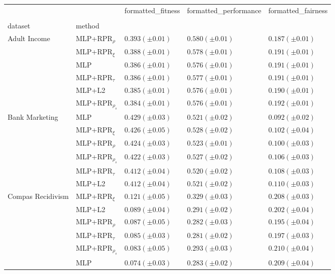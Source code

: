 \begin{tabular}{lllll}
\toprule
 &  & formatted_fitness & formatted_performance & formatted_fairness \\
 &  &  &  &  \\
dataset & method &  &  &  \\
\midrule
\multirow[t]{6}{*}{Adult Income} & MLP+RPR$_{\rho}$ & $0.393 (\pm0.01)$ & $0.580 (\pm0.01)$ & $0.187 (\pm0.01)$ \\
 & MLP+RPR$_{\xi}$ & $0.388 (\pm0.01)$ & $0.578 (\pm0.01)$ & $0.191 (\pm0.01)$ \\
 & MLP & $0.386 (\pm0.01)$ & $0.576 (\pm0.01)$ & $0.191 (\pm0.01)$ \\
 & MLP+RPR$_{\tau}$ & $0.386 (\pm0.01)$ & $0.577 (\pm0.01)$ & $0.191 (\pm0.01)$ \\
 & MLP+L2 & $0.385 (\pm0.01)$ & $0.576 (\pm0.01)$ & $0.190 (\pm0.01)$ \\
 & MLP+RPR$_{\rho_s}$ & $0.384 (\pm0.01)$ & $0.576 (\pm0.01)$ & $0.192 (\pm0.01)$ \\
\cline{1-5}
\multirow[t]{6}{*}{Bank Marketing} & MLP & $0.429 (\pm0.03)$ & $0.521 (\pm0.02)$ & $0.092 (\pm0.02)$ \\
 & MLP+RPR$_{\xi}$ & $0.426 (\pm0.05)$ & $0.528 (\pm0.02)$ & $0.102 (\pm0.04)$ \\
 & MLP+RPR$_{\rho}$ & $0.424 (\pm0.03)$ & $0.523 (\pm0.01)$ & $0.100 (\pm0.03)$ \\
 & MLP+RPR$_{\rho_s}$ & $0.422 (\pm0.03)$ & $0.527 (\pm0.02)$ & $0.106 (\pm0.03)$ \\
 & MLP+RPR$_{\tau}$ & $0.412 (\pm0.04)$ & $0.520 (\pm0.02)$ & $0.108 (\pm0.03)$ \\
 & MLP+L2 & $0.412 (\pm0.04)$ & $0.521 (\pm0.02)$ & $0.110 (\pm0.03)$ \\
\cline{1-5}
\multirow[t]{6}{*}{Compas Recidivism} & MLP+RPR$_{\xi}$ & $0.121 (\pm0.05)$ & $0.329 (\pm0.03)$ & $0.208 (\pm0.03)$ \\
 & MLP+L2 & $0.089 (\pm0.04)$ & $0.291 (\pm0.02)$ & $0.202 (\pm0.04)$ \\
 & MLP+RPR$_{\rho}$ & $0.087 (\pm0.05)$ & $0.282 (\pm0.03)$ & $0.195 (\pm0.04)$ \\
 & MLP+RPR$_{\tau}$ & $0.085 (\pm0.03)$ & $0.281 (\pm0.02)$ & $0.197 (\pm0.03)$ \\
 & MLP+RPR$_{\rho_s}$ & $0.083 (\pm0.05)$ & $0.293 (\pm0.03)$ & $0.210 (\pm0.04)$ \\
 & MLP & $0.074 (\pm0.03)$ & $0.283 (\pm0.02)$ & $0.209 (\pm0.04)$ \\
\cline{1-5}

\end{tabular}

